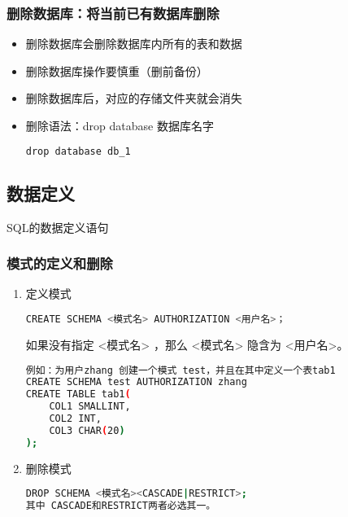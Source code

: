 \subsubsection{删除数据库：将当前已有数据库删除}
\begin{itemize}
\item 删除数据库会删除数据库内所有的表和数据
\item 删除数据库操作要慎重（删前备份）
\item 删除数据库后，对应的存储文件夹就会消失
\item 删除语法：drop database 数据库名字
\begin{lstlisting}[language=bash]
drop database db_1
\end{lstlisting}
\end{itemize}

\subsection{数据定义}
SQL的数据定义语句





\subsubsection{模式的定义和删除}
\begin{enumerate}
\item 定义模式
\begin{lstlisting}[language=bash]
CREATE SCHEMA <模式名> AUTHORIZATION <用户名>；
\end{lstlisting}
如果没有指定 <模式名> ，那么 <模式名> 隐含为 <用户名>。

\begin{lstlisting}[language=bash]
例如：为用户zhang 创建一个模式 test，并且在其中定义一个表tab1
CREATE SCHEMA test AUTHORIZATION zhang
CREATE TABLE tab1(
    COL1 SMALLINT,
    COL2 INT,
    COL3 CHAR(20)
);

\end{lstlisting}
\item 删除模式
\begin{lstlisting}[language=bash]
DROP SCHEMA <模式名><CASCADE|RESTRICT>;
其中 CASCADE和RESTRICT两者必选其一。
\end{lstlisting}
\end{enumerate}
